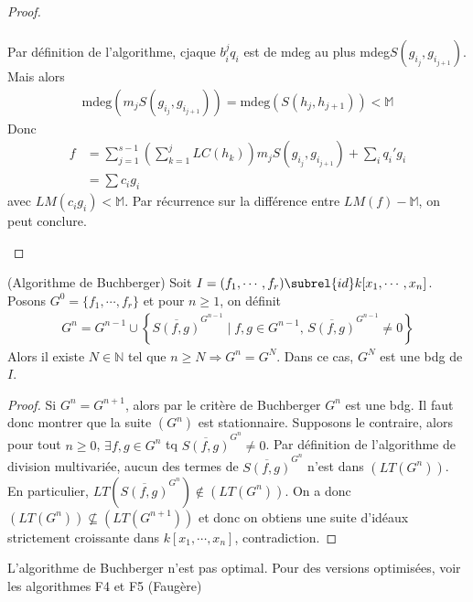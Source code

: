 \begin{proof}
\begin{enumerate}
\begin{align*}
                    \end{align*}
                    Par définition de l'algorithme, cjaque $b_i^jq_i$ est de mdeg au plus mdeg$S(g_{i_j}, g_{i_{j+1}})$. Mais alors
                    \begin{align*}
                        \mathrm{mdeg}(m_j S(g_{i_j}, g_{i_{j+1}})) = \mathrm{mdeg}(S(h_j,h_{j+1})) < \mathbb{M}
                    \end{align*}
                    Donc
                    \begin{align*}
                        f &= \sum_{j = 1}^{s-1} \left(\sum_{k = 1}^j LC(h_k) \right) m_j S(g_{i_j},g_{i_{j+1}}) + \sum_i q_i'g_i \\        
                        &= \sum c_ig_i                
                    \end{align*}
                    avec $LM(c_ig_i) < \mathbb{M}$. Par récurrence sur la différence entre $LM(f) - \mathbb{M}$, on peut conclure.
                \end{enumerate}
            \end{proof}
            \begin{coro} (Algorithme de Buchberger)
                Soit $I = (f_1, \cdots, f_r) \subrel{id} k[x_1, \cdots, x_n]$. Posons $G^0 = \{f_1, \cdots, f_r\}$ et pour $n \geq 1$, on définit
                \begin{align*}
                    G^n = G^{n-1} \cup \left\{\overline{S(f,g)}^{G^{n-1}} \mid f,g \in G^{n-1},\, \overline{S(f,g)}^{G^{n-1}} \neq 0\right\} 
                \end{align*}
                Alors il existe $N \in \mathbb{N}$ tel que $n \geq N \Rightarrow G^n = G^N$. Dans ce cas, $G^N$ est une bdg de $I$.
            \end{coro}
            \begin{proof}
                Si $G^n = G^{n+1}$, alors par le critère de Buchberger $G^n$ est une bdg. Il faut donc montrer que la suite $(G^n)$ est stationnaire. Supposons le contraire, alors pour tout $n \geq 0$, $\exists f,g \in G^n$ tq $\overline{S(f,g)}^{G^n} \neq 0$. Par définition de l'algorithme de division multivariée, aucun des termes de $\overline{S(f,g)}^{G^n}$ n'est dans $(LT(G^n))$. En particulier, $LT(\overline{S(f,g)}^{G^n}) \notin (LT(G^n))$. On a donc $(LT(G^n)) \nsubseteq (LT(G^{n+1}))$ et donc on obtiens une suite d'idéaux strictement croissante dans $k[x_1, \cdots, x_n]$, contradiction.
            \end{proof}
            \begin{remq}
                L'algorithme de Buchberger n'est pas optimal. Pour des versions optimisées, voir les algorithmes F4 et F5 (Faugère)
            \end{remq}

